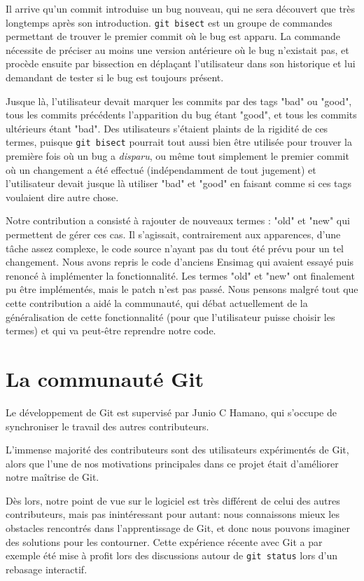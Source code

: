 \documentclass[a4paper, 12pt]{article}
\newcommand{\gitcmd}[1]{\texttt{#1}}
\begin{document}
Il arrive qu'un commit introduise un bug nouveau, qui ne sera découvert que très longtemps après son introduction. \gitcmd{git bisect} est un groupe de commandes permettant de trouver le premier commit où le bug est apparu. La commande nécessite de préciser au moins une version antérieure où le bug n'existait pas, et procède ensuite par bissection en déplaçant l'utilisateur dans son historique et lui demandant de tester si le bug est toujours présent.


Jusque là, l'utilisateur devait marquer les commits par des tags "bad" ou "good", tous les commits précédents l'apparition du bug étant "good", et tous les commits ultérieurs étant "bad". Des utilisateurs s'étaient plaints de la rigidité de ces termes, puisque \gitcmd{git bisect} pourrait tout aussi bien être utilisée pour trouver la première fois où un bug a \emph{disparu}, ou même tout simplement le premier commit où un changement a été effectué (indépendamment de tout jugement) et l'utilisateur devait jusque là utiliser "bad" et "good" en faisant comme si ces tags voulaient dire autre chose.


Notre contribution a consisté à rajouter de nouveaux termes : "old" et "new" qui permettent de gérer ces cas. Il s'agissait, contrairement aux apparences, d'une tâche assez complexe, le code source n'ayant pas du tout été prévu pour un tel changement. Nous avons repris le code d'anciens Ensimag qui avaient essayé puis renoncé à implémenter la fonctionnalité. Les termes "old" et "new" ont finalement pu être implémentés, mais le patch n'est pas passé. Nous pensons malgré tout que cette contribution a aidé la communauté, qui débat actuellement de la généralisation de cette fonctionnalité (pour que l'utilisateur puisse choisir les termes) et qui va peut-être reprendre notre code.


\section{La communauté Git}

Le développement de Git est supervisé par Junio C Hamano, qui s'occupe de synchroniser le travail des autres contributeurs.

L'immense majorité des contributeurs sont des utilisateurs expérimentés de Git, alors que l'une de nos motivations principales dans ce projet était d'améliorer notre maîtrise de Git.

Dès lors, notre point de vue sur le logiciel est très différent de celui des autres contributeurs, mais pas inintéressant pour autant: nous connaissons mieux les obstacles rencontrés dans l'apprentissage de Git, et donc nous pouvons imaginer des solutions pour les contourner. Cette expérience récente avec Git a par exemple été mise à profit lors des discussions autour de \gitcmd{git status} lors d'un rebasage interactif.
\end{document}
